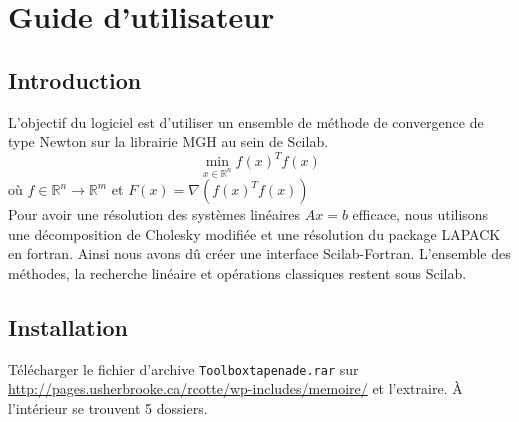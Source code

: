 
\chapter{Guide d'utilisateur}
\label{annexe:B}




\section{Introduction}
L'objectif du logiciel est d'utiliser un ensemble de méthode de convergence de type Newton sur la
librairie MGH au sein de Scilab. 
\begin{equation}
\min_{x\in \mathbb{R}^n} f(x)^Tf(x)
\end{equation}
où $f\in \mathbb{R}^n \rightarrow \mathbb{R}^m$  et $F(x)=\nabla (f(x)^Tf(x))$\\
Pour avoir une résolution des systèmes linéaires $Ax=b$ efficace, nous utilisons une décomposition de Cholesky modifiée
et une résolution du package LAPACK en fortran. Ainsi nous avons dû créer une interface Scilab-Fortran. 
L'ensemble des méthodes, la recherche linéaire et opérations classiques restent sous Scilab.


\section{Installation}


Télécharger le fichier d'archive {\tt Toolboxtapenade.rar} sur\\ \url{http://pages.usherbrooke.ca/rcotte/wp-includes/memoire/} et l'extraire. \`A l'intérieur se trouvent 5 dossiers.

